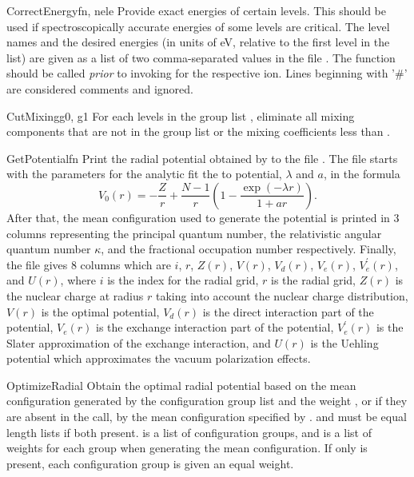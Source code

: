 \begin{fundesc}{CorrectEnergy}{fn, nele}
Provide exact energies of certain levels. This should be used if
spectroscopically accurate energies of some levels are critical. The level names
and the desired energies (in units of eV, relative to the first level in the
list) are given as a list of two comma-separated values in the file .
The function should be called {\em prior} to invoking  for
the respective ion. Lines beginning with '\#' are considered comments and
ignored.
\end{fundesc}

\begin{fundesc}{CutMixing}{g0, g1}
For each levels in the group list , eliminate all mixing components
that are not in the group list  or the mixing coefficients less than
.
\end{fundesc}

\begin{fundesc}{GetPotential}{fn}
Print the radial potential obtained by  to the file
. The file starts with the parameters for the analytic fit the to
potential, $\lambda$ and $a$, in the formula
\begin{equation}
V_0(r) = -\frac{Z}{r} + \frac{N-1}{r}\left(1-\frac{\exp(-\lambda
r)}{1+ar}\right).
\end{equation}
After that, the mean configuration used to generate the potential is printed
in 3 columns representing the principal quantum number, the relativistic
angular quantum number $\kappa$, and the fractional occupation number
respectively. Finally, the file gives 8 columns which are $i$, $r$, $Z(r)$,
$V(r)$, $V_d(r)$, $V_e(r)$, $V_e^\prime(r)$, and $U(r)$, where $i$ is the index
for the radial grid, $r$ is the radial grid, $Z(r)$ is the nuclear charge at
radius $r$ taking into account the nuclear charge distribution, $V(r)$ is the
optimal potential, $V_d(r)$ is the direct interaction part of the potential,
$V_e(r)$ is the exchange interaction part of the potential, $V_e^\prime(r)$ is
the Slater approximation of the exchange interaction, and $U(r)$ is the
Uehling potential which approximates the vacuum polarization effects.
\end{fundesc}

\begin{fundesc}{OptimizeRadial}{}
Obtain the optimal radial potential based on the mean configuration generated
by the configuration group list  and the weight , or if they are
absent in the call, by the mean configuration specified by .
 and  must be equal length lists if both present. 
is a list of configuration groups, and  is a list of weights for each
group when generating the mean configuration. If only  is present, each
configuration group is given an equal weight.
\end{fundesc}

